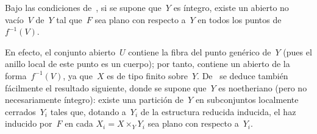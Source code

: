 \begin{corollaire}
\label{IV.6.11}
Bajo las condiciones de~, si se supone que~$Y$ es íntegro,
existe un abierto no vacío~$V$ de~$Y$ tal que~$F$ sea plano con respecto
a~$Y$ en todos los puntos de~$f^{-1}(V)$.
\end{corollaire}

En efecto, el conjunto abierto~$U$ contiene la fibra del punto genérico
de~$Y$ (pues el anillo local de este punto es un cuerpo); por tanto, contiene
un abierto de la forma~$f^{-1}(V)$, ya que~$X$ es de tipo finito sobre~$Y$.
De~ se deduce también fácilmente el resultado siguiente, donde
se supone que~$Y$ es noetheriano (pero no necesariamente íntegro): existe
una partición de~$Y$ en subconjuntos localmente cerrados~$Y_i$ tales que,
dotando a~$Y_i$ de la estructura reducida inducida, el haz inducido por~$F$
en cada $X_i=X\times_Y Y_i$ sea plano con respecto a~$Y_i$.
